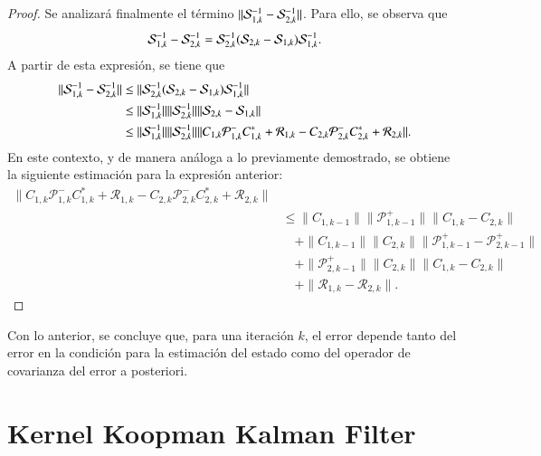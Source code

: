 \begin{proof}
Se analizará finalmente el término $\| \S_{1,k}^{-1} -  \S_{2,k}^{-1}\|$. Para ello, se observa que
\begin{equation*}
	\S_{1,k}^{-1} -  \S_{2,k}^{-1} = \S_{2,k}^{-1} (\S_{2,k} - \S_{1,k}) \S_{1,k}^{-1}.
\end{equation*}
A partir de esta expresión, se tiene que
\begin{equation*}
	\begin{aligned}
		\| \S_{1,k}^{-1} -  \S_{2,k}^{-1} \| & \leq  \| \S_{2,k}^{-1} (\S_{2,k} - \S_{1,k}) \S_{1,k}^{-1} \| \\
		& \leq \| \S_{1,k}^{-1} \| \|  \S_{2,k}^{-1} \| \| \S_{2,k} - \S_{1,k}\| \\
		& \leq  \| \S_{1,k}^{-1} \| \|  \S_{2,k}^{-1} \|  \| C_{1,k} \mathcal{P}_{1,k}^- C_{1,k}^* + \mathcal{R}_{1,k} - C_{2,k} \mathcal{P}_{2,k}^- C_{2,k}^* + \mathcal{R}_{2,k} \|.
	\end{aligned}
\end{equation*}
En este contexto, y de manera análoga a lo previamente demostrado, se obtiene la siguiente estimación para la expresión anterior:
\begin{equation*}
	\begin{aligned}
		\| C_{1,k} \mathcal{P}_{1,k}^- C_{1,k}^* + \mathcal{R}_{1,k} - C_{2,k} \mathcal{P}_{2,k}^- C_{2,k}^* + \mathcal{R}_{2,k} \| \\
		& \leq \|C_{1,k-1} \|  \| \mathcal{P}_{1,k-1}^+ \| \|  C_{1,k} - C_{2,k} \|  \\
            & \quad + \|C_{1,k-1} \|  \| C_{2,k} \| \| \mathcal{P}_{1,k-1}^+  - \mathcal{P}_{2,k-1}^+  \| \\
		& \quad + \| \mathcal{P}_{2,k-1}^+ \| \| C_{2,k}  \| \|C_{1,k} - C_{2,k} \| \\
		& \quad+ \| \mathcal{R}_{1,k} - \mathcal{R}_{2,k}  \|.
	\end{aligned}
\end{equation*}

\end{proof}

Con lo anterior, se concluye que, para una iteración $k$, el error depende tanto del error en la condición para la estimación del estado como del operador de covarianza del error a posteriori.

\section{Kernel Koopman Kalman Filter}

